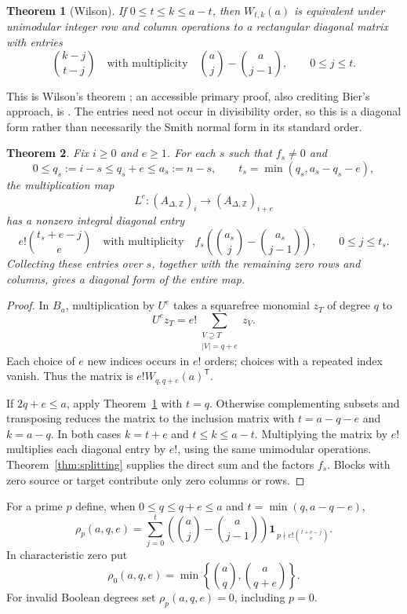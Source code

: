 \documentclass[11pt]{article}
\newtheorem{theorem}{Theorem}[section]
\theoremstyle{remark}
\newcommand{\ZZ}{\mathbb Z}
\begin{document}
\begin{theorem}[Wilson]\label{thm:wilson}
If $0\leq t\leq k\leq a-t$, then $W_{t,k}(a)$ is equivalent under unimodular integer row and column operations to a rectangular diagonal matrix with entries
\[
 \binom{k-j}{t-j}
 \quad\text{with multiplicity}\quad
 \binom aj-\binom a{j-1},\qquad 0\leq j\leq t.
\]
\end{theorem}
This is Wilson's theorem \cite{Wilson}; an accessible primary proof, also crediting Bier's approach, is \cite[Corollary 3]{GKKM}. The entries need not occur in divisibility order, so this is a diagonal form rather than necessarily the Smith normal form in its standard order.

\begin{theorem}\label{thm:diagonal}
Fix $i\geq0$ and $e\geq1$. For each $s$ such that $f_s\ne0$ and
\[
 0\leq q_s:=i-s\leq q_s+e\leq a_s:=n-s,
 \qquad t_s=\min(q_s,a_s-q_s-e),
\]
the multiplication map
\[
 L^e:(A_{\Delta,\ZZ})_i\longrightarrow(A_{\Delta,\ZZ})_{i+e}
\]
has a nonzero integral diagonal entry
\begin{equation}\label{eq:diagentries}
 e!\binom{t_s+e-j}{e}
 \quad\text{with multiplicity}\quad
 f_s\left(\binom{a_s}{j}-\binom{a_s}{j-1}\right),
 \qquad 0\leq j\leq t_s.
\end{equation}
Collecting these entries over $s$, together with the remaining zero rows and columns, gives a diagonal form of the entire map.
\end{theorem}
\begin{proof}
In $B_a$, multiplication by $U^e$ takes a squarefree monomial $z_T$ of degree $q$ to
\[
 U^e z_T=e!\sum_{\substack{V\supseteq T\\|V|=q+e}}z_V.
\]
Each choice of $e$ new indices occurs in $e!$ orders; choices with a repeated index vanish. Thus the matrix is $e!W_{q,q+e}(a)^{\mathsf T}$.

If $2q+e\leq a$, apply Theorem~\ref{thm:wilson} with $t=q$. Otherwise complementing subsets and transposing reduces the matrix to the inclusion matrix with $t=a-q-e$ and $k=a-q$. In both cases $k=t+e$ and $t\leq k\leq a-t$. Multiplying the matrix by $e!$ multiplies each diagonal entry by $e!$, using the same unimodular operations. Theorem~\ref{thm:splitting} supplies the direct sum and the factors $f_s$. Blocks with zero source or target contribute only zero columns or rows.
\end{proof}

For a prime $p$ define, when $0\leq q\leq q+e\leq a$ and $t=\min(q,a-q-e)$,
\begin{equation}\label{eq:rho}
 \rho_p(a,q,e)=
 \sum_{j=0}^t\left(\binom aj-\binom a{j-1}\right)
 \mathbf1_{\,p\nmid e!\binom{t+e-j}{e}}.
\end{equation}
In characteristic zero put
\[
 \rho_0(a,q,e)=\min\left\{\binom aq,\binom a{q+e}\right\}.
\]
For invalid Boolean degrees set $\rho_p(a,q,e)=0$, including $p=0$.
\end{document}
